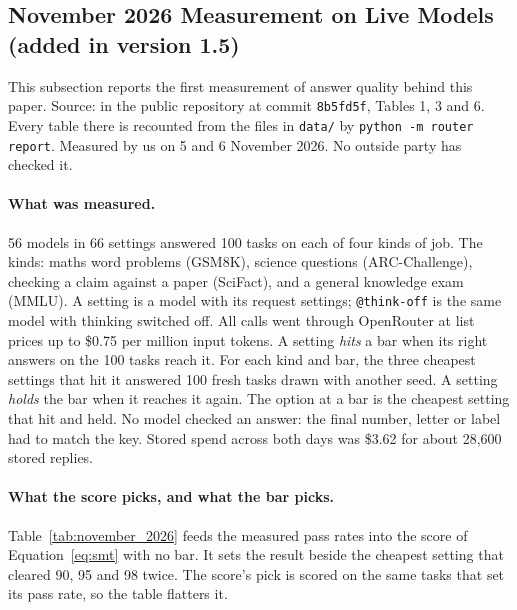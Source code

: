 \subsection{November 2026 Measurement on Live Models (added in version 1.5)}
\label{sec:november_2026}

This subsection reports the first measurement of answer quality behind this paper. Source:  in the public repository at commit \texttt{8b5fd5f}, Tables 1, 3 and 6. Every table there is recounted from the files in \texttt{data/} by \texttt{python -m router report}. Measured by us on 5 and 6 November 2026. No outside party has checked it.

\paragraph{What was measured.} 56 models in 66 settings answered 100 tasks on each of four kinds of job. The kinds: maths word problems (GSM8K), science questions (ARC-Challenge), checking a claim against a paper (SciFact), and a general knowledge exam (MMLU). A setting is a model with its request settings; \texttt{@think-off} is the same model with thinking switched off. All calls went through OpenRouter at list prices up to \$0.75 per million input tokens. A setting \emph{hits} a bar when its right answers on the 100 tasks reach it. For each kind and bar, the three cheapest settings that hit it answered 100 fresh tasks drawn with another seed. A setting \emph{holds} the bar when it reaches it again. The option at a bar is the cheapest setting that hit and held. No model checked an answer: the final number, letter or label had to match the key. Stored spend across both days was \$3.62 for about 28,600 stored replies.

\paragraph{What the score picks, and what the bar picks.} Table~\ref{tab:november_2026} feeds the measured pass rates into the score of Equation~\ref{eq:smt} with no bar. It sets the result beside the cheapest setting that cleared 90, 95 and 98 twice. The score's pick is scored on the same tasks that set its pass rate, so the table flatters it.

